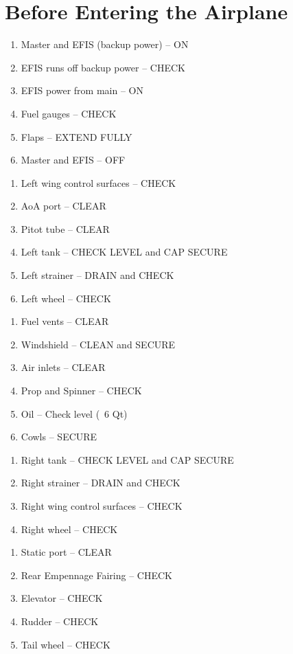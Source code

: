 \section{Before Entering the Airplane}
\begin{enumerate}[(1)]
\item Master and EFIS (backup power) -- ON
\item EFIS runs off backup power -- CHECK
\item EFIS power from main -- ON
\item Fuel gauges -- CHECK
\item Flaps -- EXTEND FULLY
\item Master and EFIS -- OFF
\end{enumerate} 	
\begin{enumerate}[(1)]
\item Left wing control surfaces -- CHECK
\item AoA port -- CLEAR
\item Pitot tube -- CLEAR
\item Left tank -- CHECK LEVEL and CAP SECURE
\item Left strainer -- DRAIN and CHECK
\item Left wheel -- CHECK
\end{enumerate}
\begin{enumerate}[(1)]
\item Fuel vents -- CLEAR
\item Windshield -- CLEAN and SECURE
\item Air inlets -- CLEAR
\item Prop and Spinner -- CHECK
\item Oil -- Check level (~6 Qt)
\item Cowls -- SECURE
\end{enumerate}
\begin{enumerate}[(1)]
\item Right tank -- CHECK LEVEL and CAP SECURE
\item Right strainer -- DRAIN and CHECK
\item Right wing control surfaces -- CHECK
\item Right wheel -- CHECK 
\end{enumerate}
\begin{enumerate}[(1)]
\item Static port -- CLEAR
\item Rear Empennage Fairing -- CHECK
\item Elevator -- CHECK
\item Rudder -- CHECK
\item Tail wheel -- CHECK
\end{enumerate}

